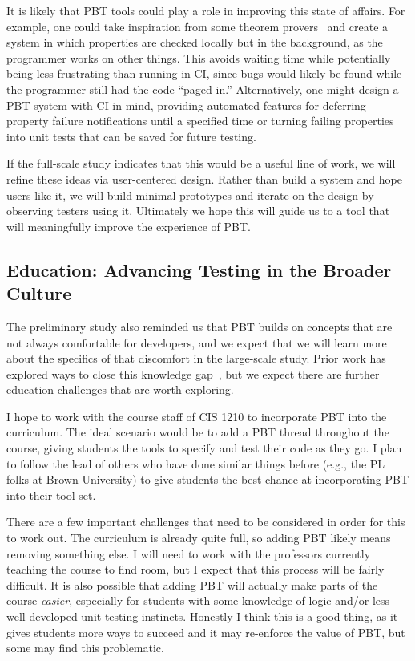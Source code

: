 It is likely that PBT tools could play a role in improving this state of
affairs. For example, one could take inspiration from some theorem
provers~\cite{berghofer2004random} and create a system in which properties are
checked locally but in the background, as the programmer works on other things.
This avoids waiting time while potentially being less frustrating than running
in CI, since bugs would likely be found while the programmer still had the code
``paged in.'' Alternatively, one might design a PBT system with CI in mind,
providing automated features for deferring property failure notifications until
a specified time or turning failing properties into unit tests that can be saved
for future testing.

If the full-scale study indicates that this would be a useful line of work, we
will refine these ideas via user-centered design. Rather than build a system and
hope users like it, we will build minimal prototypes and iterate on the design
by observing testers using it. Ultimately we hope this will guide us to a tool
that will meaningfully improve the experience of PBT.

\subsection{Education: Advancing Testing in the Broader Culture }\label{sec:ed}

The preliminary study also reminded us that PBT builds on concepts that are not
always comfortable for developers, and we expect that we will learn more about
the specifics of that discomfort in the large-scale study.  Prior work has
explored ways to close this knowledge
gap~\cite{wrenn2021using,nelson2021automated}, but we expect there are further
education challenges that are worth exploring.

I hope to work with the course staff of CIS 1210 to incorporate PBT into the
curriculum. The ideal scenario would be to add a PBT thread throughout the
course, giving students the tools to specify and test their code as they go.  I
plan to follow the lead of others who have done similar things before (e.g., the
PL folks at Brown University) to give students the best chance at incorporating
PBT into their tool-set.

There are a few important challenges that need to be considered in order for
this to work out.  The curriculum is already quite full, so adding PBT likely
means removing something else. I will need to work with the professors currently
teaching the course to find room, but I expect that this process will be fairly
difficult. It is also possible that adding PBT will actually make parts of the
course {\em easier}, especially for students with some knowledge of logic and/or
less well-developed unit testing instincts. Honestly I think this is a good
thing, as it gives students more ways to succeed and it may re-enforce the value
of PBT, but some may find this problematic.

